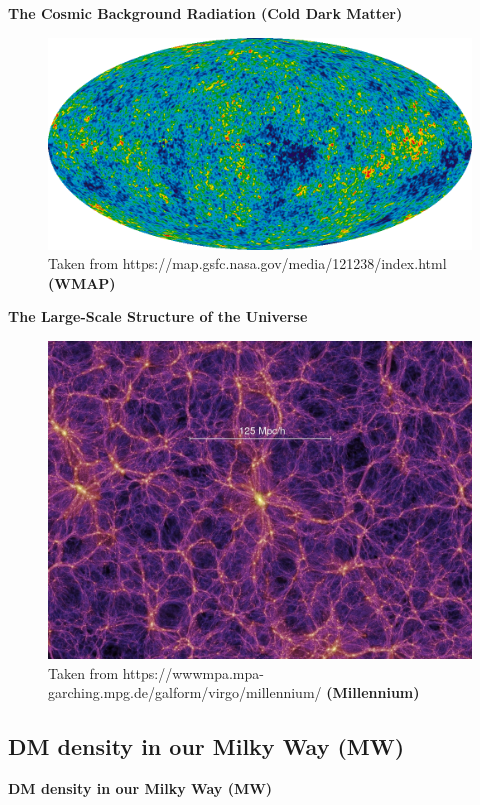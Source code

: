 \documentclass[xcolor=dvipsnames]{beamer}
\begin{document}
\begin{frame}
\centering
\large
\textbf{The Cosmic Background Radiation (Cold Dark Matter)}

\begin{figure}
\includegraphics[width=1\linewidth]{./pics/CMB.png}
\caption{\tiny Taken from https://map.gsfc.nasa.gov/media/121238/index.html \textbf{(WMAP)}}
\end{figure}
\end{frame}

\begin{frame}
\centering
\large
\textbf{The Large-Scale Structure of the Universe}

\begin{figure}
\includegraphics[width=0.6\linewidth]{./pics/LargeScale.jpg}
\caption{\tiny Taken from https://wwwmpa.mpa-garching.mpg.de/galform/virgo/millennium/ \textbf{(Millennium)}}
\end{figure}
\end{frame}

\subsection{DM density in our Milky Way (MW)}
\begin{frame}
\centering
\LARGE
\textbf{DM density in our Milky Way (MW)}
\normalsize
\end{frame}
\end{document}
